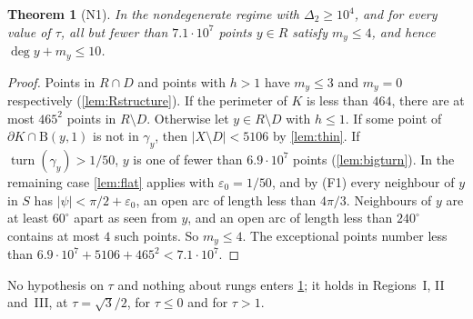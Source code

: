 \documentclass[11pt]{amsart}
\newtheorem{theorem}{Theorem}[section]
\theoremstyle{definition}
\theoremstyle{remark}
\newcommand{\Dt}{\Delta_2}
\newcommand{\eps}{\varepsilon}
\newcommand{\turn}{\operatorname{turn}}
\newcommand{\Dd}{\mathrm{B}}      %
\begin{document}
\begin{theorem}[N1]\label{thm:N1}
In the nondegenerate regime with $\Dt\ge10^4$, and for every value of $\tau$, all but fewer than $7.1\cdot10^7$ points $y\in R$ satisfy $m_y\le4$, and hence $\deg y+m_y\le10$.
\end{theorem}
\begin{proof}
Points in $R\cap D$ and points with $h>1$ have $m_y\le3$ and $m_y=0$ respectively (\cref{lem:Rstructure}). If the perimeter of $K$ is less than $464$, there are at most $465^2$ points in $R\setminus D$. Otherwise let $y\in R\setminus D$ with $h\le1$. If some point of $\partial K\cap\Dd(y,1)$ is not in $\gamma_y$, then $|X\setminus D|<5106$ by \cref{lem:thin}. If $\turn(\gamma_y)>1/50$, $y$ is one of fewer than $6.9\cdot10^7$ points (\cref{lem:bigturn}). In the remaining case \cref{lem:flat} applies with $\eps_0=1/50$, and by (F1) every neighbour of $y$ in $S$ has $|\psi|<\pi/2+\eps_0$, an open arc of length less than $4\pi/3$. Neighbours of $y$ are at least $60^\circ$ apart as seen from $y$, and an open arc of length less than $240^\circ$ contains at most $4$ such points. So $m_y\le4$. The exceptional points number less than $6.9\cdot10^7+5106+465^2<7.1\cdot10^7$.
\end{proof}

No hypothesis on $\tau$ and nothing about rungs enters \cref{thm:N1}; it holds in Regions~I, II and~III, at $\tau=\sqrt3/2$, for $\tau\le0$ and for $\tau>1$.
\end{document}
